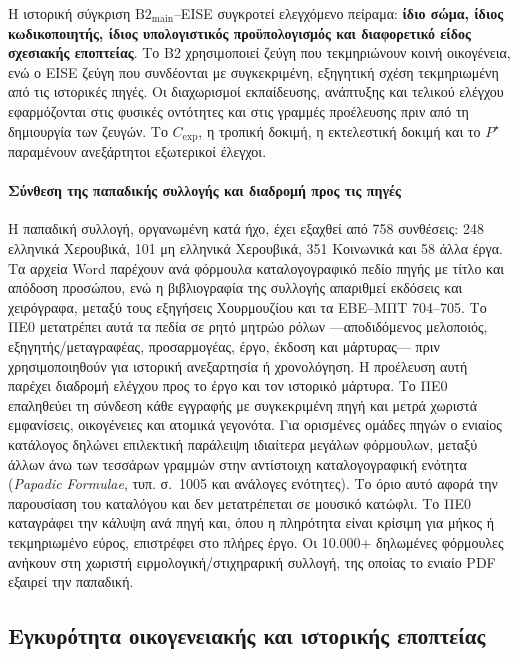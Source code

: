 \documentclass[11pt,a4paper]{article}
\begin{document}
Η ιστορική σύγκριση $\mathrm{B2}_{\mathrm{main}}$--EISE συγκροτεί ελεγχόμενο πείραμα: \textbf{ίδιο σώμα, ίδιος κωδικοποιητής, ίδιος υπολογιστικός προϋπολογισμός και διαφορετικό είδος σχεσιακής εποπτείας}. Το B2 χρησιμοποιεί ζεύγη που τεκμηριώνουν κοινή οικογένεια, ενώ ο EISE ζεύγη που συνδέονται με συγκεκριμένη, εξηγητική σχέση τεκμηριωμένη από τις ιστορικές πηγές. Οι διαχωρισμοί εκπαίδευσης, ανάπτυξης και τελικού ελέγχου εφαρμόζονται στις φυσικές οντότητες και στις γραμμές προέλευσης πριν από τη δημιουργία των ζευγών. Το $C_{\mathrm{exp}}$, η τροπική δοκιμή, η εκτελεστική δοκιμή και το $P^{\star}$ παραμένουν ανεξάρτητοι εξωτερικοί έλεγχοι.

\paragraph{Σύνθεση της παπαδικής συλλογής και διαδρομή προς τις πηγές}
Η παπαδική συλλογή, οργανωμένη κατά ήχο, έχει εξαχθεί από 758 συνθέσεις: 248 ελληνικά Χερουβικά, 101 μη ελληνικά Χερουβικά, 351 Κοινωνικά και 58 άλλα έργα. Τα αρχεία Word παρέχουν ανά φόρμουλα καταλογογραφικό πεδίο πηγής με τίτλο και απόδοση προσώπου, ενώ η βιβλιογραφία της συλλογής απαριθμεί εκδόσεις και χειρόγραφα, μεταξύ τους εξηγήσεις Χουρμουζίου και τα ΕΒΕ--ΜΠΤ 704--705. Το ΠΕ0 μετατρέπει αυτά τα πεδία σε ρητό μητρώο ρόλων ---αποδιδόμενος μελοποιός, εξηγητής/μεταγραφέας, προσαρμογέας, έργο, έκδοση και μάρτυρας--- πριν χρησιμοποιηθούν για ιστορική ανεξαρτησία ή χρονολόγηση. Η προέλευση αυτή παρέχει διαδρομή ελέγχου προς το έργο και τον ιστορικό μάρτυρα. Το ΠΕ0 επαληθεύει τη σύνδεση κάθε εγγραφής με συγκεκριμένη πηγή και μετρά χωριστά εμφανίσεις, οικογένειες και ατομικά γεγονότα. Για ορισμένες ομάδες πηγών ο ενιαίος κατάλογος δηλώνει επιλεκτική παράλειψη ιδιαίτερα μεγάλων φόρμουλων, μεταξύ άλλων άνω των τεσσάρων γραμμών στην αντίστοιχη καταλογογραφική ενότητα (\emph{Papadic Formulae}, τυπ. σ.~1005 και ανάλογες ενότητες). Το όριο αυτό αφορά την παρουσίαση του καταλόγου και δεν μετατρέπεται σε μουσικό κατώφλι. Το ΠΕ0 καταγράφει την κάλυψη ανά πηγή και, όπου η πληρότητα είναι κρίσιμη για μήκος ή τεκμηριωμένο εύρος, επιστρέφει στο πλήρες έργο. Οι 10.000+ δηλωμένες φόρμουλες ανήκουν στη χωριστή ειρμολογική/στιχηραρική συλλογή, της οποίας το ενιαίο PDF εξαιρεί την παπαδική.

\subsection{Εγκυρότητα οικογενειακής και ιστορικής εποπτείας}\label{app:corpora-supervision}
\end{document}
